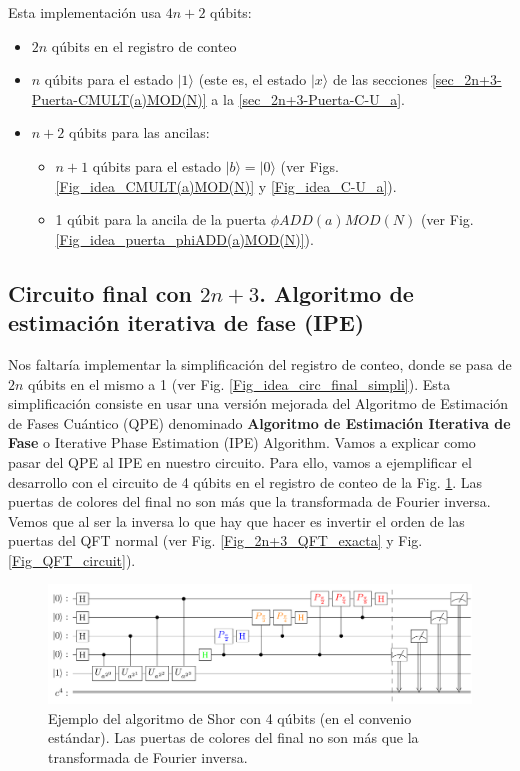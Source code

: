 \documentclass[a4paper,11pt]{book} %
\numberwithin{equation}{chapter}
\begin{document}
Esta implementación usa $4n+2$ qúbits:
\begin{itemize}
	\item $2n$ qúbits en el registro de conteo
	\item $n$ qúbits para el estado $|1\rangle$ (este es, el estado $|x \rangle$ de las secciones \ref{sec_2n+3-Puerta-CMULT(a)MOD(N)} a la \ref{sec_2n+3-Puerta-C-U_a}.
	\item $n+2$ qúbits para las ancilas:
	\begin{itemize}
		\item $n+1$ qúbits para el estado $|b \rangle = | 0 \rangle$ (ver Figs. \ref{Fig_idea_CMULT(a)MOD(N)} y \ref{Fig_idea_C-U_a}).
		\item 1 qúbit para la ancila de la puerta $\phi ADD(a)MOD(N)$ (ver Fig. \ref{Fig_idea_puerta_phiADD(a)MOD(N)}).
    \end{itemize}

\end{itemize}



\subsection{Circuito final con $2n+3$. Algoritmo de estimación iterativa de fase (IPE) } \label{sec_2n+3-Circuito-final-simplificado}

Nos faltaría implementar la simplificación del registro de conteo, donde se pasa de $2n$ qúbits en el mismo a 1 (ver Fig. \ref{Fig_idea_circ_final_simpli}). Esta simplificación consiste en usar una versión mejorada del Algoritmo de Estimación de Fases Cuántico (QPE) denominado \textbf{Algoritmo de Estimación Iterativa de Fase} o Iterative Phase Estimation (IPE) Algorithm. Vamos a explicar como pasar del QPE al IPE en nuestro circuito. Para ello, vamos a ejemplificar el desarrollo con el circuito de 4 qúbits en el registro de conteo de la Fig. \ref{Fig_IPE_1}. Las puertas de colores del final no son más que la transformada de Fourier inversa. Vemos que al ser la inversa lo que hay que hacer es invertir el orden de las puertas del QFT normal (ver Fig. \ref{Fig_2n+3_QFT_exacta} y Fig. \ref{Fig_QFT_circuit}).


\begin{figure}[t]
\centering
\includegraphics[width=1\linewidth]{Figuras/Fig_IPE_1.png}
\caption{Ejemplo del algoritmo de Shor con 4 qúbits (en el convenio estándar). Las puertas de colores del final no son más que la transformada de Fourier inversa.}
\label{Fig_IPE_1}
\end{figure}
\end{document}
